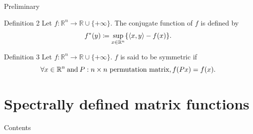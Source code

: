 \documentclass[aspectratio=169, dvipdfmx, 11pt]{beamer} %
\newcommand{\RealNumberSet}{\mathbb{R}}
\newcommand{\NDemenstionalRealEuclidianSpace}{\mathbb{R}^n}
\newcommand{\InnerProduct}[2]{\left\langle {#1},{#2}\right\rangle} %
\newcommand{\ExtendedRealValuedFunction}[2]{{#1}: {#2} \to \RealNumberSet \cup \{+\infty\}}
\newcommand{\ConjugateFunction}[1]{{#1}^*}
\begin{document}
\begin{frame}{Preliminary}
  \begin{block}{Definition 2}
    Let $\ExtendedRealValuedFunction{f}{\NDemenstionalRealEuclidianSpace}$.
    The conjugate function of $f$ is defined by
    \begin{equation}
      \ConjugateFunction{f}(y) \coloneqq \sup_{x \in \NDemenstionalRealEuclidianSpace} \{ \InnerProduct{x}{y} - f(x) \}. \notag
    \end{equation}
  \end{block}

  \begin{block}{Definition 3}
    Let $\ExtendedRealValuedFunction{f}{\NDemenstionalRealEuclidianSpace}$.
    $f$ is said to be symmetric if
    \begin{equation}
      \forall x \in \NDemenstionalRealEuclidianSpace \:\text{and}\: P: n \times n \text{ permutation matrix}, f(Px) = f(x). \notag
    \end{equation}
  \end{block}
\end{frame}

\section{Spectrally defined matrix functions}
\begin{frame}{Contents}
  \tableofcontents[currentsection]
\end{frame}
\end{document}
